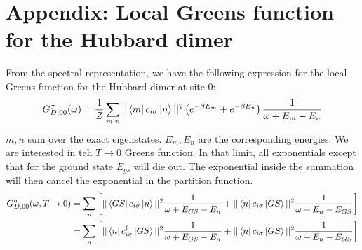 \documentclass[12pt]{article}
\numberwithin{equation}{section}
\begin{document}
\section*{Appendix: Local Greens function for the Hubbard dimer}
From the spectral representation, we have the following expression for the local Greens function for the Hubbard dimer at site $0$:
\begin{equation}\begin{aligned}
	G_{D,00}^\sigma(\omega) = \frac{1}{Z}\sum_{m,n}||\bra{m}c_{i\sigma}\ket{n}||^2\left( e^{-\beta E_m} + e^{-\beta E_n}\right)\frac{1}{\omega + E_m - E_n}
\end{aligned}\end{equation}
$m,n$ sum over the exact eigenstates. $E_m, E_n$ are the corresponding energies. We are interested in teh $T \to 0$ Greens function. In that limit, all exponentials except that for the ground state $E_{gs}$ will die out. The exponential inside the summation will then cancel the exponential in the partition function.
\begin{equation}\begin{aligned}
	G_{D,00}^\sigma(\omega, T \to 0) &= \sum_{n}\left[||\bra{GS}c_{i\sigma}\ket{n}||^2\frac{1}{\omega + E_{GS} - E_n} + ||\bra{n}c_{i\sigma}\ket{GS}||^2\frac{1}{\omega + E_n - E_{GS}}\right]\\
					&= \sum_{n}\left[||\bra{n}c^\dagger_{i\sigma}\ket{GS}||^2\frac{1}{\omega + E_{GS} - E_n} + ||\bra{n}c_{i\sigma}\ket{GS}||^2\frac{1}{\omega + E_n - E_{GS}}\right]\\
\end{aligned}\end{equation}
\end{document}
